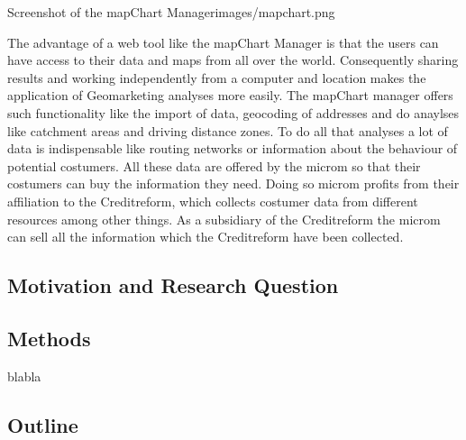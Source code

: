 \begin{figureOwn}{Screenshot of the mapChart Manager}{images/mapchart.png}\end{figureOwn}

The advantage of a web tool like the mapChart Manager is that the users can have access to their data and maps from all over the world. Consequently sharing results and working independently from a computer and location makes the application of Geomarketing analyses more easily. The mapChart manager offers such functionality like the import of data, geocoding of addresses and do anaylses like catchment areas and driving distance zones. To do all that analyses a lot of data is indispensable  like routing networks or information about the behaviour of potential costumers. All these data are offered by the microm so that their costumers can buy the information they need. Doing so microm profits from their affiliation to the Creditreform, which collects costumer data from different resources among other things. As a subsidiary of the Creditreform the microm can sell all the information which the Creditreform have been collected.

\subsection{Motivation and Research Question}


\subsection{Methods}
blabla

\subsection{Outline}